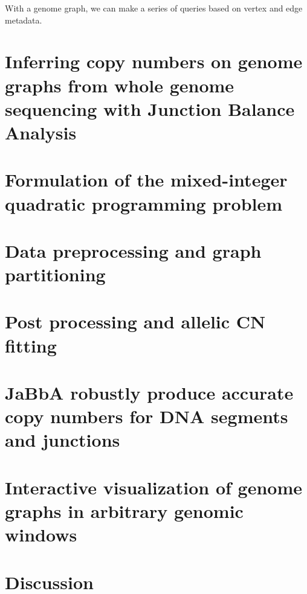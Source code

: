 \documentclass[phd,tocprelim]{cornell}
\begin{document}
With a genome graph, we can make a series of queries based on vertex and edge metadata.


\section{Inferring copy numbers on genome graphs from whole genome sequencing with Junction Balance Analysis}


\section{Formulation of the mixed-integer quadratic programming problem}


\section{Data preprocessing and graph partitioning}


\section{Post processing and allelic CN fitting}

\section{JaBbA robustly produce accurate copy numbers for DNA segments and junctions}

\section{}


\section{Interactive visualization of genome graphs in arbitrary genomic windows}

\section{Discussion}

\end{document}

